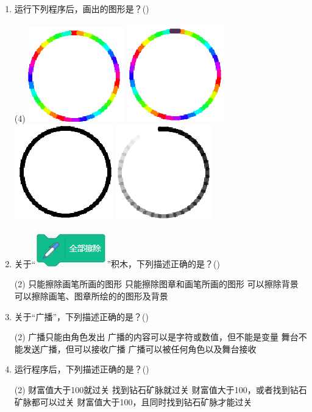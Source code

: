 \documentclass[10pt, a4paper]{article}
\newcommand{\hq}{\hfill(\qquad)}
\begin{document}
\begin{enumerate}
        \item 运行下列程序后，画出的图形是？\hq
        \begin{tasks}(4)
            \task \includegraphics[width=.08\textwidth]{figure/10a.png}
            \task \includegraphics[width=.08\textwidth]{figure/10b.png}
            \task \includegraphics[width=.08\textwidth]{figure/10c.png}
            \task \includegraphics[width=.08\textwidth]{figure/10d.png}
        \end{tasks}

        \item 关于“\includegraphics[width=.1\textwidth]{figure/11.png}”积木，下列描述正确的是？\hq
        \begin{tasks}(2)
            \task 只能擦除画笔所画的图形
            \task 只能擦除图章和画笔所画的图形
            \task 可以擦除背景
            \task 可以擦除画笔、图章所绘的的图形及背景
        \end{tasks}

        \item 关于“广播”，下列描述正确的是？\hq
        \begin{tasks}(2)
            \task 广播只能由角色发出
            \task 广播的内容可以是字符或数值，但不能是变量
            \task 舞台不能发送广播，但可以接收广播
            \task 广播可以被任何角色以及舞台接收
        \end{tasks}

        \item 运行程序后，下列描述正确的是？\hq
        \begin{tasks}(2)
            \task 财富值大于100就过关
            \task 找到钻石矿脉就过关
            \task 财富值大于100，或者找到钻石矿脉都可以过关
            \task 财富值大于100，且同时找到钻石矿脉才能过关
        \end{tasks}
        

\end{enumerate}
\end{document}
